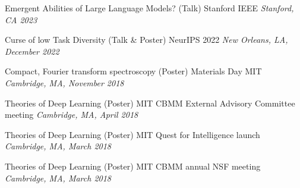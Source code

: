 \documentclass{article}
\newenvironment{changemargin}[2]{%
  \begin{list}{}{%
    \setlength{\topsep}{0pt}%
    \setlength{\leftmargin}{#1}%
    \setlength{\rightmargin}{#2}%
    \setlength{\listparindent}{\parindent}%
    \setlength{\itemindent}{\parindent}%
    \setlength{\parsep}{\parskip}%
  }%
  \item[]}{\end{list}
}
\newenvironment{body} {
	\vspace*{-16pt}
	\begin{changemargin}{-0.25in}{-0.5in}
  }	
	{\end{changemargin}
}
\begin{document}
\begin{body}



	
    \vspace{15 pt}

    Emergent Abilities of Large Language Models? (Talk)
    \hfill
    Stanford IEEE
	\hfill %
	\emph{Stanford, CA 2023}\\
	\vspace*{-3pt}
    
    Curse of low Task Diversity (Talk \& Poster)
    \hfill
    NeurIPS 2022
	\hfill %
	\emph{New Orleans, LA, December 2022}\\
	\vspace*{-3pt}

    \vspace{5 pt}
    Compact, Fourier transform spectroscopy (Poster)
    \hfill
    Materials Day MIT
	\hfill %
	\emph{Cambridge, MA, November 2018}\\
	\vspace*{-3pt}
    
    \vspace{5 pt}
    Theories of Deep Learning (Poster)
    \hfill
    MIT CBMM External Advisory Committee meeting
	\hfill %
	\emph{Cambridge, MA, April 2018}\\
	\vspace*{-3pt}
	
	\vspace{5 pt}
    Theories of Deep Learning (Poster)
    \hfill
    MIT Quest for Intelligence launch
	\hfill %
	\emph{Cambridge, MA, March 2018}\\
	\vspace*{-3pt}
	
	\vspace{5 pt}
    Theories of Deep Learning (Poster)
    \hfill
    MIT CBMM annual NSF meeting
	\hfill %
	\emph{Cambridge, MA, March 2018}\\
	\vspace*{-3pt}
	

\end{body}
\end{document}
